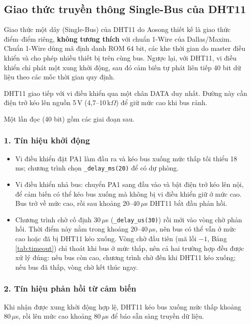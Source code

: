 \subsection{Giao thức truyền thông Single-Bus của DHT11}
\label{sec:dht11-protocol}

Giao thức một dây (Single-Bus) của DHT11 do Aosong thiết kế là giao thức điểm--điểm riêng, \textbf{không tương thích} với chuẩn 1-Wire của Dallas/Maxim. Chuẩn 1-Wire dùng mã định danh ROM 64 bit, các khe thời gian do master điều khiển và cho phép nhiều thiết bị trên cùng bus. Ngược lại, với DHT11, vi điều khiển chỉ phát một xung khởi động, sau đó cảm biến tự phát liên tiếp 40 bit dữ liệu theo các mốc thời gian quy định.

DHT11 giao tiếp với vi điều khiển qua một chân DATA duy nhất. Đường này cần điện trở kéo lên nguồn 5\,V (4,7--10\,k$\Omega$) để giữ mức cao khi bus rảnh.

Một lần đọc (40 bit) gồm các giai đoạn sau.

\subsubsection{1. Tín hiệu khởi động}
\begin{itemize}[leftmargin=1.2cm]
    \item Vi điều khiển đặt PA1 làm đầu ra và kéo bus xuống mức thấp tối thiểu 18\,ms; chương trình chọn \texttt{\_delay\_ms(20)} để có dự phòng.
    \item Vi điều khiển nhả bus: chuyển PA1 sang đầu vào và bật điện trở kéo lên nội, để cảm biến có thể kéo bus xuống mà không bị vi điều khiển giữ ở mức cao. Bus trở về mức cao, rồi sau khoảng 20--40\,$\mu$s DHT11 bắt đầu phản hồi.
    \item Chương trình chờ cố định 30\,$\mu$s (\texttt{\_delay\_us(30)}) rồi mới vào vòng chờ phản hồi. Thời điểm này nằm trong khoảng 20--40\,$\mu$s, nên bus có thể vẫn ở mức cao hoặc đã bị DHT11 kéo xuống. Vòng chờ đầu tiên (mã lỗi $-1$, Bảng \ref{tab:timeout}) chỉ thoát khi bus ở mức thấp, nên cả hai trường hợp đều được xử lý đúng: nếu bus còn cao, chương trình chờ đến khi DHT11 kéo xuống; nếu bus đã thấp, vòng chờ kết thúc ngay.
\end{itemize}

\subsubsection{2. Tín hiệu phản hồi từ cảm biến}
Khi nhận được xung khởi động hợp lệ, DHT11 kéo bus xuống mức thấp khoảng 80\,$\mu$s, rồi lên mức cao khoảng 80\,$\mu$s để báo sẵn sàng truyền dữ liệu.

